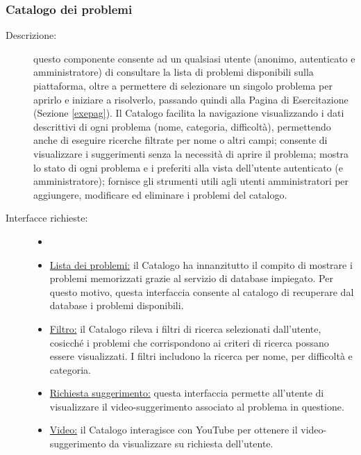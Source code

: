 \documentclass[11pt, a4paper]{article}
\theoremstyle{definition} %
\begin{document}
\subsubsection{Catalogo dei problemi}
\begin{description}
    \item[Descrizione:] questo componente consente ad un qualsiasi utente
    (anonimo, autenticato e amministratore) di consultare la lista di problemi
    disponibili sulla piattaforma, oltre a permettere di selezionare un singolo
    problema per aprirlo e iniziare a risolverlo, passando quindi alla Pagina di
    Esercitazione (Sezione \ref{exepag}).
    Il Catalogo facilita la navigazione visualizzando i dati descrittivi di ogni
    problema (nome, categoria, difficoltà), permettendo anche di eseguire ricerche
    filtrate per nome o altri campi; consente di visualizzare i suggerimenti senza
    la necessità di aprire il problema; mostra lo stato di ogni problema e i
    preferiti alla vista dell'utente autenticato (e amministratore); fornisce gli
    strumenti utili agli utenti amministratori per aggiungere, modificare ed
    eliminare i problemi del catalogo.

    \item[Interfacce richieste:]
    \begin{itemize}
        \item[]

        \item \underline{Lista dei problemi:} il Catalogo ha innanzitutto il compito di
        mostrare i problemi memorizzati grazie al servizio di database impiegato. Per questo
        motivo, questa interfaccia consente al catalogo di recuperare dal database i
        problemi disponibili.

        \item \underline{Filtro:} il Catalogo rileva i filtri di ricerca selezionati
        dall'utente, cosicché i problemi che corrispondono ai criteri di ricerca possano
        essere visualizzati. I filtri includono la ricerca per nome, per difficoltà e categoria.

        \item \underline{Richiesta suggerimento:} questa interfaccia permette all'utente
        di visualizzare il video-suggerimento associato al problema in questione.

        \item \underline{Video:} il Catalogo interagisce con YouTube per ottenere il
        video-suggerimento da visualizzare su richiesta dell'utente.


\end{itemize}
\end{description}
\end{document}
